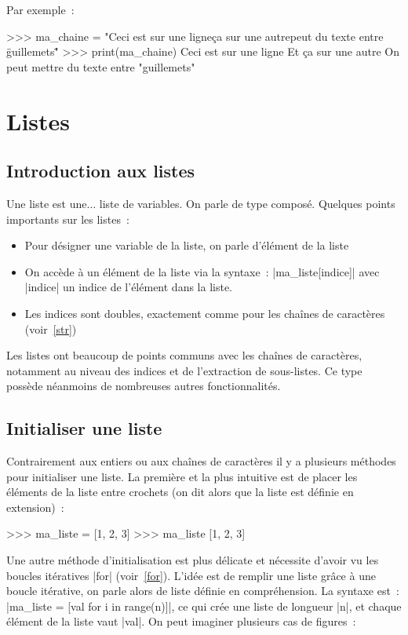		Par exemple~:
		\begin{pythoncode}
			>>> ma_chaine = "Ceci est sur une ligne\nEt ça sur une autre\nOn peut du texte entre \"guillemets\""
			>>> print(ma_chaine)
			Ceci est sur une ligne
			Et ça sur une autre
			On peut mettre du texte entre "guillemets"
		\end{pythoncode}
		
\section{Listes} \label{list}

	\subsection{Introduction aux listes}
		
		Une liste est une$\ldots$ liste de variables. On parle de type composé.
		Quelques points importants sur les listes~:
		\begin{itemize}	
			\item Pour désigner une variable de la liste, on parle d'élément de la liste
			\item On accède à un élément de la liste via la syntaxe~: \python|ma_liste[indice]| avec \python|indice| un indice de l'élément dans la liste.
			\item Les indices sont doubles, exactement comme pour les chaînes de caractères (voir~\ref{str})
		\end{itemize}
		
		Les listes ont beaucoup de points communs avec les chaînes de caractères, notamment au niveau des indices et de l'extraction de sous-listes.
		Ce type possède néanmoins de nombreuses autres fonctionnalités.
	
	\subsection{Initialiser une liste}
		
		Contrairement aux entiers ou aux chaînes de caractères il y a plusieurs méthodes pour initialiser une liste. La première et la plus intuitive est de placer les éléments de la liste entre crochets (on dit alors que la liste est définie en extension)~:
		\begin{pythoncode}
			>>> ma_liste = [1, 2, 3]
			>>> ma_liste
			[1, 2, 3]
		\end{pythoncode}
		
		Une autre méthode d'initialisation est plus délicate et nécessite d'avoir vu les boucles itératives \python|for| (voir~\ref{for}).
		L'idée est de remplir une liste grâce à une boucle itérative, on parle alors de liste définie en compréhension. La syntaxe est~: \python|ma_liste = [val for i in range(n)]|, ce qui crée une liste de longueur \python|n|, et chaque élément de la liste vaut \python|val|.
		On peut imaginer plusieurs cas de figures~:
		
